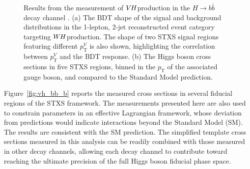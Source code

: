 \documentclass{moriond}
\def\wh{\texorpdfstring{\ensuremath{W\kern -0.1em H}\xspace}{WH\xspace}}
\def\vh{\texorpdfstring{\ensuremath{V\kern -0.1em H}\xspace}{VH\xspace}}
\begin{document}
\begin{figure}[!htbp]
  \centering
  \caption{
    Results from the measurement of \vh production in the $H{\rightarrow}b\bar b$ decay channel \cite{Aaboud:2019nan}.
    (a) The BDT shape of the signal and background distributions in the 1-lepton, 2-jet
    reconstructed event category targeting \wh production. The shape of two STXS signal regions
    featuring different $p^{V}_\mathrm{T}$ is also shown, highlighting the correlation between
    $p^{V}_\mathrm{T}$ and the BDT response.
    (b) The Higgs boson cross sections in five STXS regions, binned in the $p_\mathrm{T}$ of
    the associated gauge boson, and compared to the Standard Model prediction.
  }
  \label{fig:vh_bb}
\end{figure}

Figure~\ref{fig:vh_bb_b} reports the measured cross sections in several fiducial regions
of the STXS framework. The measurements presented here are also used
to constrain parameters in an effective Lagrangian framework, whose
deviation from predictions would indicate interactions beyond the Standard Model (SM).
The results are consistent with the SM prediction.
The
simplified template cross sections measured in this analysis can be readily combined with those measured in other
decay channels, allowing each decay channel to contribute toward reaching the ultimate precision of
the full Higgs boson fiducial phase space.
\end{document}
